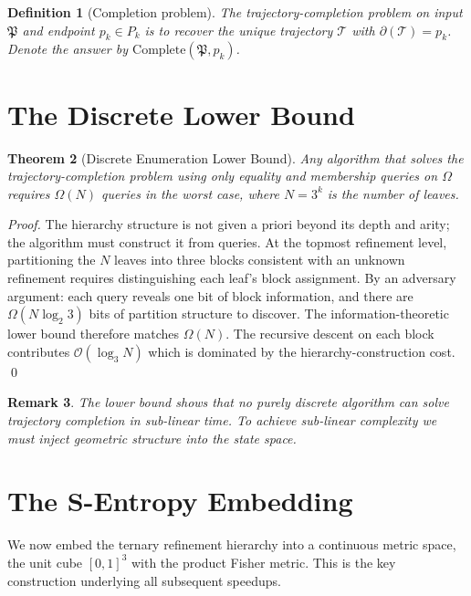 \documentclass[twocolumn,a4paper]{article}
\newtheorem{theorem}{Theorem}[section]
\newtheorem{definition}[theorem]{Definition}
\newtheorem{remark}[theorem]{Remark}
\newcommand{\PPart}{\mathfrak{P}}
\newcommand{\Trajec}{\mathcal{T}}
\newcommand{\Endp}{\partial}
\begin{document}
\begin{definition}[Completion problem]
\label{def:completion-problem}
The \emph{trajectory-completion problem} on input $\PPart$ and endpoint $p_{k}\in P_{k}$ is to recover the unique trajectory $\Trajec$ with $\Endp(\Trajec)=p_{k}$. Denote the answer by $\mathrm{Complete}(\PPart,p_{k})$.
\end{definition}

\section{The Discrete Lower Bound}
\label{sec:discrete-lower}

\begin{theorem}[Discrete Enumeration Lower Bound]
\label{thm:discrete-lower}
Any algorithm that solves the trajectory-completion problem using only equality and membership queries on $\Omega$ requires $\Omega(N)$ queries in the worst case, where $N=3^{k}$ is the number of leaves.
\end{theorem}

\begin{proof}
The hierarchy structure is not given a priori beyond its depth and arity; the algorithm must construct it from queries. At the topmost refinement level, partitioning the $N$ leaves into three blocks consistent with an unknown refinement requires distinguishing each leaf's block assignment. By an adversary argument: each query reveals one bit of block information, and there are $\Omega(N\log_{2}3)$ bits of partition structure to discover. The information-theoretic lower bound therefore matches $\Omega(N)$. The recursive descent on each block contributes $\mathcal{O}(\log_{3}N)$ which is dominated by the hierarchy-construction cost. \qed
\end{proof}

\begin{remark}
The lower bound shows that no purely discrete algorithm can solve trajectory completion in sub-linear time. To achieve sub-linear complexity we must inject geometric structure into the state space.
\end{remark}

\section{The S-Entropy Embedding}
\label{sec:s-entropy-embedding}

We now embed the ternary refinement hierarchy into a continuous metric space, the unit cube $[0,1]^{3}$ with the product Fisher metric. This is the key construction underlying all subsequent speedups.
\end{document}
